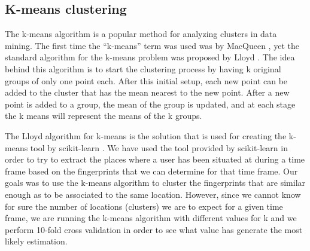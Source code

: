 \subsection{K-means clustering}
\label{k-means}

The k-means algorithm is a popular method for analyzing clusters in data mining.
The first time the ``k-means'' term was used was by MacQueen
\cite{Macqueen67somemethods}, yet the standard algorithm for the k-means problem
was proposed by Lloyd \cite{Lloyd:2006:LSQ:2263356.2269955}. The idea behind
this algorithm is to start the clustering process by having k original groups of
only one point each. After this initial setup, each new point can be added to
the cluster that has the mean nearest to the new point. After a new point is
added to a group, the mean of the group is updated, and at each stage the k
means will represent the means of the k groups.

The Lloyd algorithm for k-means is the solution that is used for creating the
k-means tool by scikit-learn \cite{SL}. We have used the tool provided by
scikit-learn in order to try to extract the places where a user has been
situated at during a time frame based on the fingerprints that we can determine
for that time frame. Our goals was to use the k-means algorithm to cluster the
fingerprints that are similar enough as to be associated to the same location.
However, since we cannot know for sure the number of locations (clusters) we are
to expect for a given time frame, we are running the k-means algorithm with
different values for k and we perform 10-fold cross validation in order to see
what value has generate the most likely estimation.


